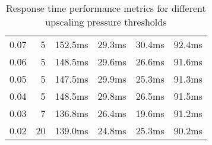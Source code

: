 \begin{table}[]
\begin{tabular}{lrrrrr}
0.07                                                                              & 5                                                              & 152.5ms                                                     & 29.3ms                                                      & 30.4ms                                                         & 92.4ms                                                         \\
0.06                                                                              & 5                                                              & 148.5ms                                                     & 29.6ms                                                      & 26.6ms                                                         & 91.6ms                                                         \\
0.05                                                                              & 5                                                              & 147.5ms                                                     & 29.9ms                                                      & 25.3ms                                                         & 91.3ms                                                         \\
0.04                                                                              & 5                                                              & 148.5ms                                                     & 29.8ms                                                      & 26.5ms                                                         & 91.5ms                                                         \\
0.03                                                                              & 7                                                              & 136.8ms                                                     & 26.4ms                                                      & 19.6ms                                                         & 91.2ms                                                         \\
0.02                                                                              & 20                                                             & 139.0ms                                                     & 24.8ms                                                      & 25.3ms                                                         & 90.2ms                                                         \\ \hline
\end{tabular}
\caption{Response time performance metrics for different upscaling pressure thresholds}
\label{tab:osmotic_scaling_aggressiveness}
\end{table}



